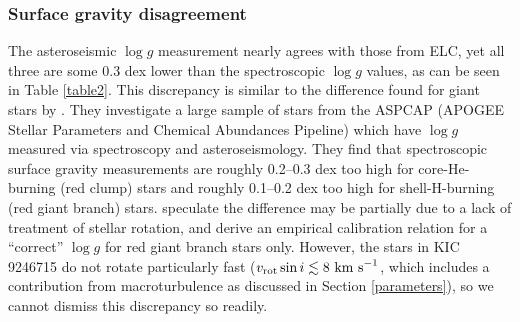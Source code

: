 \subsubsection{Surface gravity disagreement}\label{gravity_compare}
The asteroseismic $\log g$ measurement nearly agrees with those from ELC, yet all three are some 0.3 dex lower than the spectroscopic $\log g$ values, as can be seen in Table \ref{table2}. This discrepancy is similar to the difference found for giant stars by \citet{hol15}. They investigate a large sample of stars from the ASPCAP (APOGEE Stellar Parameters and Chemical Abundances Pipeline) which have $\log g$ measured via spectroscopy and asteroseismology. They find that spectroscopic surface gravity measurements are roughly 0.2--0.3 dex too high for core-He-burning (red clump) stars and roughly 0.1--0.2 dex too high for shell-H-burning (red giant branch) stars. \citet{hol15} speculate the difference may be partially due to a lack of treatment of stellar rotation, and derive an empirical calibration relation for a ``correct'' $\log g$ for red giant branch stars only. However, the stars in KIC 9246715 do not rotate particularly fast ($v_{\rm{rot}} \sin i \lesssim 8 \ \rm{km \ s}^{-1}$, which includes a contribution from macroturbulence as discussed in Section \ref{parameters}), so we cannot dismiss this discrepancy so readily.
